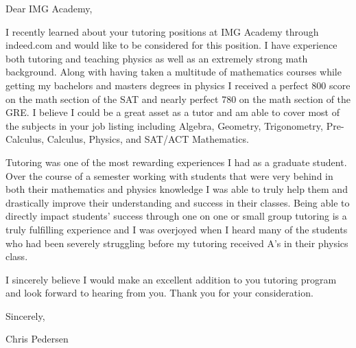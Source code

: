 \documentclass{resume} %
\begin{document}

\begin{rSection}{}
Dear IMG Academy,

I recently learned about your tutoring positions at IMG Academy through indeed.com and would like to be considered for this position. I have experience both tutoring and teaching physics as well as an extremely strong math background. Along with having taken a multitude of mathematics courses while getting my bachelors and masters degrees in physics I received a perfect 800 score on the math section of the SAT and nearly perfect 780 on the math section of the GRE. I believe I could be a great asset as a tutor and am able to cover most of the subjects in your job listing including Algebra, Geometry, Trigonometry, Pre-Calculus, Calculus, Physics, and SAT/ACT Mathematics.

Tutoring was one of the most rewarding experiences I had as a graduate student. Over the course of a semester working with students that were very behind in both their mathematics and physics knowledge I was able to truly help them and drastically improve their understanding and success in their classes. Being able to directly impact students' success through one on one or small group tutoring is a truly fulfilling experience and I was overjoyed when I heard many of the students who had been severely struggling before my tutoring received A's in their physics class.

I sincerely believe I would make an excellent addition to you tutoring program and look forward to hearing from you. Thank you for your consideration.

Sincerely,

Chris Pedersen




\end{rSection}


\end{document}
